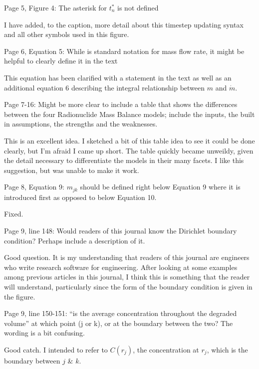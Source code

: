 \documentclass[answers,12pt]{exam}
\begin{document}
\begin{questions}
\question Page 5, Figure 4: The asterisk for $t^*_n$ is not defined 
\begin{solution}
I have added, to the caption, more detail about this timestep updating syntax 
and all other symbols used in this figure.  \end{solution} 


\question Page  6,  Equation  5: While   is standard notation for mass flow 
rate, it might be helpful to clearly define it in the text \begin{solution}
This equation has been clarified with a statement in the text as well as an 
        additional equation 6 describing the integral relationship between $m$ 
        and $\dot{m}$.
\end{solution} 
 
\question Page  7-16:  Might  be  more  clear  to  include  a  table  that  
shows  the  differences  between  the  four Radionuclide  Mass  Balance  
models;  include  the  inputs,  the  built  in  assumptions,  the  strengths  
and  the weaknesses.  \begin{solution}
This is an excellent idea. I sketched a bit of this table idea to see it could 
        be done clearly, but I'm afraid I came up short. The table quickly 
        became unweildy, given the detail necessary to differentiate the models 
        in their many facets. I like this suggestion, but was unable to make it 
        work.
\end{solution} 
 
\question Page  8,  Equation  9:  $m_{jk}$  should be defined right below 
Equation 9 where it is introduced first as opposed to below Equation 10.  
\begin{solution}
Fixed.
\end{solution} 
 
\question Page  9, line 148: Would readers of this journal know the Dirichlet 
boundary condition? Perhaps include a description of it.  \begin{solution}
Good question. It is my understanding that readers of this journal are 
                engineers who write research software for engineering. After 
                looking at some examples among previous articles in this 
                journal, I think this is something that the reader will 
                understand, particularly since the form of the boundary 
                condition is given in the figure.
\end{solution} 
 
\question Page  9,  line  150-151:  ``is  the  average  concentration 
throughout the degraded volume'' at which point (j or k), or at the boundary 
between the two? The wording is a bit confusing.  \begin{solution}
        Good catch. I intended to refer to $C(r_j)$, the concentration at 
        $r_j$, which is the boundary between $j$ \& $k$.
\end{solution} 
 

\end{questions}
\end{document}
